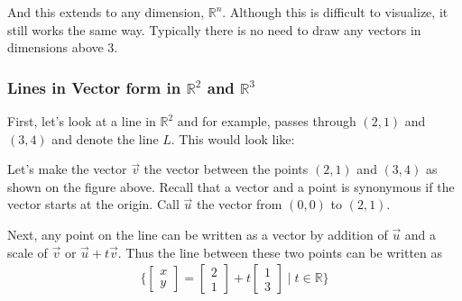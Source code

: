And this extends to any dimension, $\mathbb{R}^n$.  Although this is difficult to visualize, it still works the same way.  Typically there is no need to draw any vectors in dimensions above 3.  

\subsubsection{Lines in Vector form in $\mathbb{R}^2$ and $\mathbb{R}^3$}

First, let's look at a line in $\mathbb{R}^2$ and for example, passes through $(2,1)$ and $(3,4)$ and denote the line $L$. This would look like:
%
\begin{center}
\end{center}

Let's make the vector $\vec{v}$ the vector between the points $(2,1)$ and $(3,4)$ as shown on the figure above.  Recall that a vector and a point is synonymous if the vector starts at the origin.  Call $\vec{u}$ the vector from $(0,0)$ to $(2,1)$. 

Next, any point on the line can be written as a vector by addition of $\vec{u}$ and a scale of $\vec{v}$ or $\vec{u}+t\vec{v}$.  Thus the line between these two points can be written as
%
\begin{align*}
\{ 
\begin{bmatrix}
x \\ y 
\end{bmatrix} = 
\begin{bmatrix}
2 \\ 1
\end{bmatrix} + t 
\begin{bmatrix}
1 \\ 3
\end{bmatrix} \; | \; t \in \mathbb{R} \} 
\end{align*}

